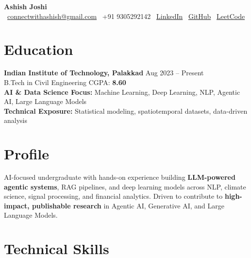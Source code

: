 \documentclass[a4paper, 10.5pt]{article}
\begin{document}
\begin{center}
  {\LARGE\bfseries\color{heading} Ashish Joshi}\\[7pt]
  {\small
    \faEnvelope\ \href{mailto:connectwithashish@gmail.com}{connectwithashish@gmail.com}
    \enspace\textbar\enspace
    \faPhone\ +91 9305292142
    \enspace\textbar\enspace
    \faLinkedin\ \href{https://www.linkedin.com/in/ashish-joshi-6204442b7/}{LinkedIn}
    \enspace\textbar\enspace
    \faGithub\ \href{https://github.com/31ASHISH}{GitHub}
    \enspace\textbar\enspace
    \faCode\ \href{https://leetcode.com/u/Ashish_Joshi31/}{LeetCode}
  }
\end{center}

\vspace{-2pt}

\section{Education}

\textbf{Indian Institute of Technology, Palakkad} \hfill \textcolor{subtext}{\small Aug 2023 -- Present}\\
B.Tech in Civil Engineering \hfill CGPA: \textbf{8.60}\\[2pt]
{\textbf{AI \& Data Science Focus:} Machine Learning, Deep Learning, NLP, Agentic AI, Large Language Models}\\
{\textbf{Technical Exposure:} Statistical modeling, spatiotemporal datasets, data-driven analysis}

\section{Profile}

{\small
AI-focused undergraduate with hands-on experience building \textbf{LLM-powered agentic systems}, RAG pipelines, and deep learning models across NLP, climate science, signal processing, and financial analytics.
Driven to contribute to \textbf{high-impact, publishable research} in Agentic AI, Generative AI, and Large Language Models.
}

\section{Technical Skills}
\end{document}
